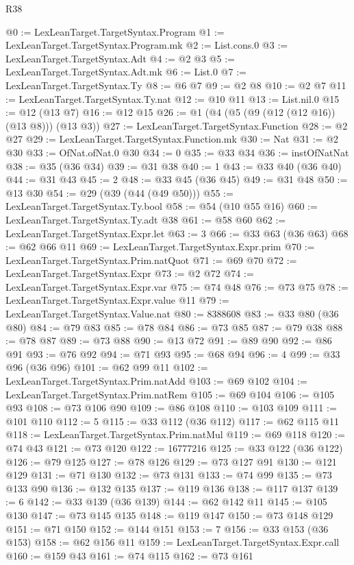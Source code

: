 \begin{lexlean}{R38}
\begin{coremodule}
@0 := LexLeanTarget.TargetSyntax.Program
@1 := LexLeanTarget.TargetSyntax.Program.mk
@2 := List.cons.{0}
@3 := LexLeanTarget.TargetSyntax.Adt
@4 := @2 @3
@5 := LexLeanTarget.TargetSyntax.Adt.mk
@6 := List.{0}
@7 := LexLeanTarget.TargetSyntax.Ty
@8 := @6 @7
@9 := @2 @8
@10 := @2 @7
@11 := LexLeanTarget.TargetSyntax.Ty.nat
@12 := @10 @11
@13 := List.nil.{0}
@15 := @12 (@13 @7)
@16 := @12 @15
@26 := @1 (@4 (@5 (@9 (@12 (@12 @16)) (@13 @8))) (@13 @3))
@27 := LexLeanTarget.TargetSyntax.Function
@28 := @2 @27
@29 := LexLeanTarget.TargetSyntax.Function.mk
@30 := Nat
@31 := @2 @30
@33 := OfNat.ofNat.{0} @30
@34 := 0
@35 := @33 @34
@36 := instOfNatNat
@38 := @35 (@36 @34)
@39 := @31 @38
@40 := 1
@43 := @33 @40 (@36 @40)
@44 := @31 @43
@45 := 2
@48 := @33 @45 (@36 @45)
@49 := @31 @48
@50 := @13 @30
@54 := @29 (@39 (@44 (@49 @50)))
@55 := LexLeanTarget.TargetSyntax.Ty.bool
@58 := @54 (@10 @55 @16)
@60 := LexLeanTarget.TargetSyntax.Ty.adt @38
@61 := @58 @60
@62 := LexLeanTarget.TargetSyntax.Expr.let
@63 := 3
@66 := @33 @63 (@36 @63)
@68 := @62 @66 @11
@69 := LexLeanTarget.TargetSyntax.Expr.prim
@70 := LexLeanTarget.TargetSyntax.Prim.natQuot
@71 := @69 @70
@72 := LexLeanTarget.TargetSyntax.Expr
@73 := @2 @72
@74 := LexLeanTarget.TargetSyntax.Expr.var
@75 := @74 @48
@76 := @73 @75
@78 := LexLeanTarget.TargetSyntax.Expr.value @11
@79 := LexLeanTarget.TargetSyntax.Value.nat
@80 := 8388608
@83 := @33 @80 (@36 @80)
@84 := @79 @83
@85 := @78 @84
@86 := @73 @85
@87 := @79 @38
@88 := @78 @87
@89 := @73 @88
@90 := @13 @72
@91 := @89 @90
@92 := @86 @91
@93 := @76 @92
@94 := @71 @93
@95 := @68 @94
@96 := 4
@99 := @33 @96 (@36 @96)
@101 := @62 @99 @11
@102 := LexLeanTarget.TargetSyntax.Prim.natAdd
@103 := @69 @102
@104 := LexLeanTarget.TargetSyntax.Prim.natRem
@105 := @69 @104
@106 := @105 @93
@108 := @73 @106 @90
@109 := @86 @108
@110 := @103 @109
@111 := @101 @110
@112 := 5
@115 := @33 @112 (@36 @112)
@117 := @62 @115 @11
@118 := LexLeanTarget.TargetSyntax.Prim.natMul
@119 := @69 @118
@120 := @74 @43
@121 := @73 @120
@122 := 16777216
@125 := @33 @122 (@36 @122)
@126 := @79 @125
@127 := @78 @126
@129 := @73 @127 @91
@130 := @121 @129
@131 := @71 @130
@132 := @73 @131
@133 := @74 @99
@135 := @73 @133 @90
@136 := @132 @135
@137 := @119 @136
@138 := @117 @137
@139 := 6
@142 := @33 @139 (@36 @139)
@144 := @62 @142 @11
@145 := @105 @130
@147 := @73 @145 @135
@148 := @119 @147
@150 := @73 @148 @129
@151 := @71 @150
@152 := @144 @151
@153 := 7
@156 := @33 @153 (@36 @153)
@158 := @62 @156 @11
@159 := LexLeanTarget.TargetSyntax.Expr.call
@160 := @159 @43
@161 := @74 @115
@162 := @73 @161

\end{coremodule}
\end{lexlean}
